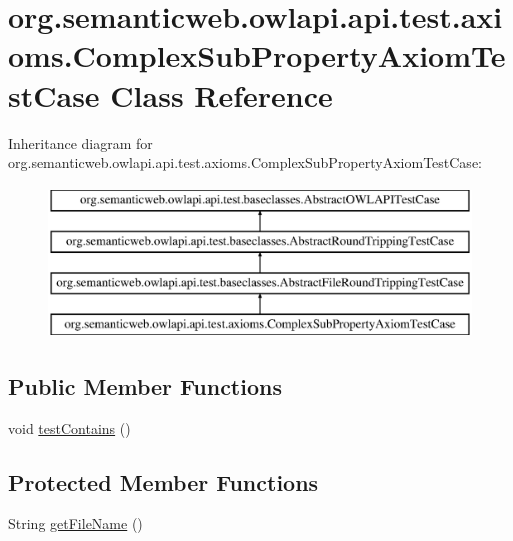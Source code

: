 \hypertarget{classorg_1_1semanticweb_1_1owlapi_1_1api_1_1test_1_1axioms_1_1_complex_sub_property_axiom_test_case}{\section{org.\-semanticweb.\-owlapi.\-api.\-test.\-axioms.\-Complex\-Sub\-Property\-Axiom\-Test\-Case Class Reference}
\label{classorg_1_1semanticweb_1_1owlapi_1_1api_1_1test_1_1axioms_1_1_complex_sub_property_axiom_test_case}
}
Inheritance diagram for org.\-semanticweb.\-owlapi.\-api.\-test.\-axioms.\-Complex\-Sub\-Property\-Axiom\-Test\-Case\-:\begin{figure}[H]
\begin{center}
\leavevmode
\includegraphics[height=4.000000cm]{classorg_1_1semanticweb_1_1owlapi_1_1api_1_1test_1_1axioms_1_1_complex_sub_property_axiom_test_case}
\end{center}
\end{figure}
\subsection*{Public Member Functions}
\begin{DoxyCompactItemize}
\item 
void \hyperlink{classorg_1_1semanticweb_1_1owlapi_1_1api_1_1test_1_1axioms_1_1_complex_sub_property_axiom_test_case_ab01afe0ae2f0ac73897a5779a972fc9e}{test\-Contains} ()
\end{DoxyCompactItemize}
\subsection*{Protected Member Functions}
\begin{DoxyCompactItemize}
\item 
String \hyperlink{classorg_1_1semanticweb_1_1owlapi_1_1api_1_1test_1_1axioms_1_1_complex_sub_property_axiom_test_case_a512255984e6d98d0398b4548aabfe31d}{get\-File\-Name} ()
\end{DoxyCompactItemize}


